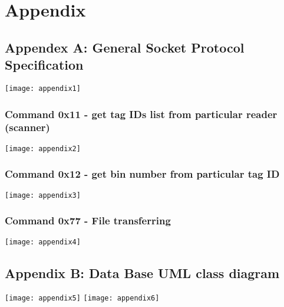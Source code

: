 %
\section{Appendix}

\subsection{Appendex A: General Socket Protocol Specification}

\texttt{[image: appendix1]}

\subsubsection{Command 0x11 - get tag IDs list from particular reader (scanner)}

\texttt{[image: appendix2]}

\subsubsection{Command 0x12 - get bin number from particular tag ID}

\texttt{[image: appendix3]}

\subsubsection{Command 0x77 - File transferring}

\texttt{[image: appendix4]}

\newpage

\subsection{Appendix B: Data Base UML class diagram}

\texttt{[image: appendix5]}
\texttt{[image: appendix6]}
